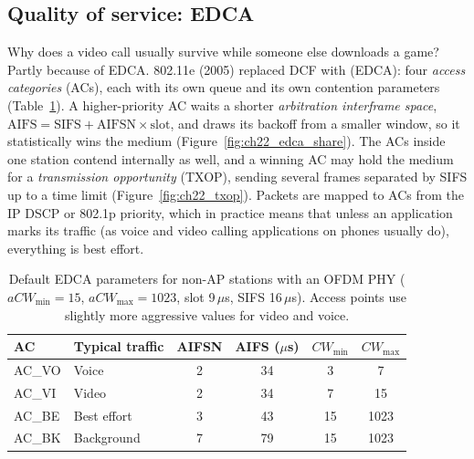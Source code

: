 \subsection{Quality of service: EDCA}

Why does a video call usually survive while someone else downloads a game? Partly because of
EDCA. 802.11e (2005) replaced DCF with  (EDCA): four
\emph{access categories} (ACs), each with its own queue and its own contention parameters
(Table~\ref{tab:ch22:edca}). A higher-priority AC waits a shorter \emph{arbitration interframe
space}, $\text{AIFS}=\text{SIFS}+\text{AIFSN}\times\text{slot}$, and draws its backoff from a smaller
window, so it statistically wins the medium (Figure~\ref{fig:ch22_edca_share}). The ACs inside one
station contend internally as well, and a winning AC may hold the medium for a \emph{transmission
opportunity} (TXOP), sending several frames separated by SIFS up to a time limit
(Figure~\ref{fig:ch22_txop}). Packets are mapped to ACs from the IP DSCP or 802.1p priority, which
in practice means that unless an application marks its traffic (as voice and video calling
applications on phones usually do), everything is best effort.

\begin{table}[htbp]\centering\small
\caption{Default EDCA parameters for non-AP stations with an OFDM PHY ($a CW_{\min}=15$,
$a CW_{\max}=1023$, slot 9\,$\mu$s, SIFS 16\,$\mu$s). Access points use slightly more aggressive
values for video and voice.}
\label{tab:ch22:edca}
\begin{tabular}{@{}l l c c c c@{}}
\toprule
AC & Typical traffic & AIFSN & AIFS ($\mu$s) & $CW_{\min}$ & $CW_{\max}$\\
\midrule
AC\_VO & Voice & 2 & 34 & 3 & 7\\
AC\_VI & Video & 2 & 34 & 7 & 15\\
AC\_BE & Best effort & 3 & 43 & 15 & 1023\\
AC\_BK & Background & 7 & 79 & 15 & 1023\\
\bottomrule
\end{tabular}
\end{table}



